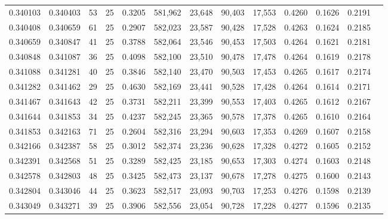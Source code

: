 \begin{tabular}{rrrrrrrrrrrrr}
0.340103 & 0.340403 &    53 &  25 &                                     0.3205 & 581,962 &  23,648 &  90,403 &  17,553 & 0.4260 & 0.1626 & 0.2191 \\
0.340408 & 0.340659 &    61 &  25 &                                     0.2907 & 582,023 &  23,587 &  90,428 &  17,528 & 0.4263 & 0.1624 & 0.2185 \\
0.340659 & 0.340847 &    41 &  25 &                                     0.3788 & 582,064 &  23,546 &  90,453 &  17,503 & 0.4264 & 0.1621 & 0.2181 \\
0.340848 & 0.341087 &    36 &  25 &                                     0.4098 & 582,100 &  23,510 &  90,478 &  17,478 & 0.4264 & 0.1619 & 0.2178 \\
0.341088 & 0.341281 &    40 &  25 &                                     0.3846 & 582,140 &  23,470 &  90,503 &  17,453 & 0.4265 & 0.1617 & 0.2174 \\
0.341282 & 0.341462 &    29 &  25 &                                     0.4630 & 582,169 &  23,441 &  90,528 &  17,428 & 0.4264 & 0.1614 & 0.2171 \\
0.341467 & 0.341643 &    42 &  25 &                                     0.3731 & 582,211 &  23,399 &  90,553 &  17,403 & 0.4265 & 0.1612 & 0.2167 \\
0.341644 & 0.341853 &    34 &  25 &                                     0.4237 & 582,245 &  23,365 &  90,578 &  17,378 & 0.4265 & 0.1610 & 0.2164 \\
0.341853 & 0.342163 &    71 &  25 &                                     0.2604 & 582,316 &  23,294 &  90,603 &  17,353 & 0.4269 & 0.1607 & 0.2158 \\
0.342166 & 0.342387 &    58 &  25 &                                     0.3012 & 582,374 &  23,236 &  90,628 &  17,328 & 0.4272 & 0.1605 & 0.2152 \\
0.342391 & 0.342568 &    51 &  25 &                                     0.3289 & 582,425 &  23,185 &  90,653 &  17,303 & 0.4274 & 0.1603 & 0.2148 \\
0.342578 & 0.342803 &    48 &  25 &                                     0.3425 & 582,473 &  23,137 &  90,678 &  17,278 & 0.4275 & 0.1600 & 0.2143 \\
0.342804 & 0.343046 &    44 &  25 &                                     0.3623 & 582,517 &  23,093 &  90,703 &  17,253 & 0.4276 & 0.1598 & 0.2139 \\
0.343049 & 0.343271 &    39 &  25 &                                     0.3906 & 582,556 &  23,054 &  90,728 &  17,228 & 0.4277 & 0.1596 & 0.2135 \\

\end{tabular}
